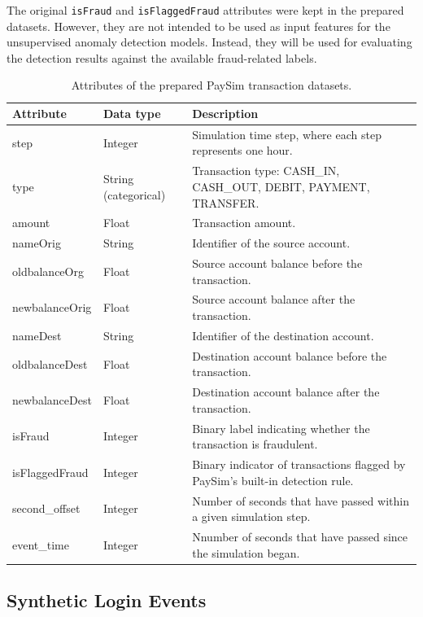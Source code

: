\documentclass[titlepage]{article}
\begin{document}
The original \texttt{isFraud} and \texttt{isFlaggedFraud} attributes were kept in the prepared datasets. However, they are not intended to be used as input features for the unsupervised anomaly detection models. Instead, they will be used for evaluating the detection results against the available fraud-related labels.

\begin{table}[H]
    \centering
    \caption{Attributes of the prepared PaySim transaction datasets.}
    \label{tab:paysim_data_description}
    \small
    \begin{tabular}{lll}
        \toprule
        \textbf{Attribute} & \textbf{Data type} & \textbf{Description}\\
        \midrule
        step & Integer & Simulation time step, where each step represents one hour.\\
        type & String (categorical) & Transaction type: CASH\_IN, CASH\_OUT, DEBIT, PAYMENT, TRANSFER.\\
        amount & Float & Transaction amount.\\
        nameOrig & String & Identifier of the source account. \\
        oldbalanceOrg & Float & Source account balance before the transaction.\\
        newbalanceOrig & Float & Source account balance after the transaction. \\
        nameDest & String & Identifier of the destination account. \\
        oldbalanceDest & Float & Destination account balance before the transaction.\\
        newbalanceDest & Float & Destination account balance after the transaction. \\
        isFraud & Integer & Binary label indicating whether the transaction is fraudulent. \\
        isFlaggedFraud & Integer & Binary indicator of transactions flagged by PaySim's built-in detection rule. \\
        second\_offset & Integer & Number of seconds that have passed within a given simulation step. \\
        event\_time & Integer &Nnumber of seconds that have passed since the simulation began. \\
        \bottomrule
    \end{tabular}
\end{table}

\subsection{Synthetic Login Events}
\end{document}
